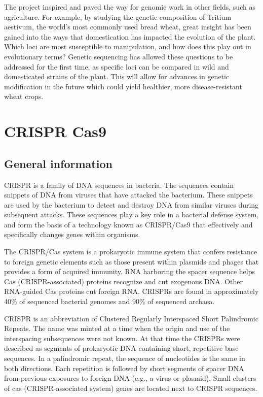 \documentclass[12pt]{article}
\begin{document}
The project inspired and paved the way for genomic work in other fields, such as agriculture. For example, by studying the genetic composition of Tritium aestivum, the world's most commonly used bread wheat, great insight has been gained into the ways that domestication has impacted the evolution of the plant. Which loci are most susceptible to manipulation, and how does this play out in evolutionary terms? Genetic sequencing has allowed these questions to be addressed for the first time, as specific loci can be compared in wild and domesticated strains of the plant. This will allow for advances in genetic modification in the future which could yield healthier, more disease-resistant wheat crops.

\section{CRISPR Cas9}

\subsection{General information}

CRISPR is a family of DNA sequences in bacteria. The sequences contain snippets of DNA from viruses that have attacked the bacterium. These snippets are used by the bacterium to detect and destroy DNA from similar viruses during subsequent attacks. These sequences play a key role in a bacterial defense system, and form the basis of a technology known as CRISPR/Cas9 that effectively and specifically changes genes within organisms.

The CRISPR/Cas system is a prokaryotic immune system that confers resistance to foreign genetic elements such as those present within plasmids and phages that provides a form of acquired immunity. RNA harboring the spacer sequence helps Cas (CRISPR-associated) proteins recognize and cut exogenous DNA. Other RNA-guided Cas proteins cut foreign RNA. CRISPRs are found in approximately 40\% of sequenced bacterial genomes and 90\% of sequenced archaea.

CRISPR is an abbreviation of Clustered Regularly Interspaced Short Palindromic Repeats. The name was minted at a time when the origin and use of the interspacing subsequences were not known. At that time the CRISPRs were described as segments of prokaryotic DNA containing short, repetitive base sequences. In a palindromic repeat, the sequence of nucleotides is the same in both directions. Each repetition is followed by short segments of spacer DNA from previous exposures to foreign DNA (e.g., a virus or plasmid). Small clusters of cas (CRISPR-associated system) genes are located next to CRISPR sequences.
\end{document}
